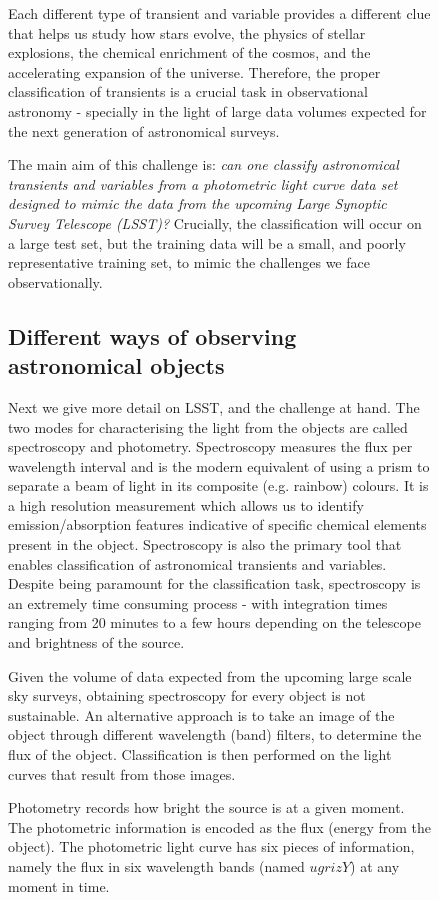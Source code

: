 \documentclass[\docopts]{\docclass}
\begin{document}
\begin{figure}[htbp!]
Each different type of transient and variable provides a different clue that helps us study how stars evolve, the physics of stellar explosions, the chemical enrichment of the cosmos, and the accelerating expansion of the universe.  Therefore, the proper classification of transients is a crucial task in observational astronomy - specially in the light of large data volumes expected for the next generation of astronomical surveys.

The main aim of this challenge is: \textit{can one classify astronomical transients and variables from a photometric light curve data set designed to mimic the data from the upcoming Large Synoptic Survey Telescope (LSST)?} Crucially, the classification will occur on a large test set, but the training data will be a small, and poorly representative training set, to mimic the challenges we face observationally.

\subsection{Different ways of observing astronomical objects}
Next we give more detail on LSST, and the challenge at hand. The two modes for characterising the light from the objects are called spectroscopy and photometry.
Spectroscopy measures the flux per wavelength interval and is the modern equivalent of using a prism to separate a beam of light in its composite (e.g. rainbow) colours. It is a high resolution measurement which allows us to identify emission/absorption features indicative of specific chemical elements present in the object.  Spectroscopy is also the primary tool that enables classification of astronomical transients and variables. Despite being paramount for the classification task, spectroscopy is an extremely time consuming process - with integration times ranging from 20 minutes to a few hours depending on the telescope and brightness of the source.

Given the volume of data expected from the upcoming large scale sky surveys, obtaining spectroscopy for every object is not sustainable. An alternative approach is to take an image of the object through different wavelength (band) filters, to determine the flux of the object. Classification is then performed on the light curves that result from those images.

Photometry records how bright the source is at a given moment. The photometric information is encoded as the flux (energy from the object). The photometric light curve has six pieces of information, namely the flux in six wavelength bands (named $ugrizY$) at any moment in time.


\end{figure}
\end{document}
